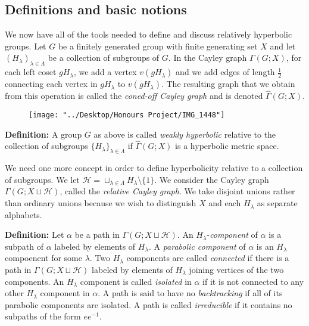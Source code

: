 \documentclass[12pt]{article}
\newcommand{\vs}{\vskip10pt}
\begin{document}
	\subsection{Definitions and basic notions}
	
	We now have all of the tools needed to define and discuss relatively hyperbolic groups. Let $G$ be a finitely generated group with finite generating set $X$ and let $(H_{\lambda})_{\lambda \in \Lambda}$ be a collection of subgroups of $G$. In the Cayley graph $\Gamma(G;X)$, for each left coset $gH_{\lambda}$, we add a vertex $v(gH_{\lambda})$ and we add edges of length $\frac{1}{2}$ connecting each vertex in $gH_{\lambda}$ to $v(gH_{\lambda})$. The resulting graph that we obtain from this operation is called the \textit{coned-off Cayley graph} and is denoted $\hat{\Gamma}(G;X)$.
	
	
	\vs 
\begin{figure}
	\centering
	\texttt{[image: "../Desktop/Honours Project/IMG\_1448"]}
	\caption{}
	\label{fig:img1448}
\end{figure}
	
	\textbf{Definition: } A group $G$ as above is called \textit{weakly hyperbolic} relative to the collection of subgroups $\{H_{\lambda}\}_{\lambda \in \Lambda}$ if $\hat{\Gamma}(G;X)$ is a hyperbolic metric space. 
	
	\vs 
	
	We need one more concept in order to define hyperbolicity relative to a collection of subgroups. We let $\mathcal{H} = \sqcup_{\lambda \in \Lambda} H_{\lambda} \setminus \{1\}$. We consider the Cayley graph $\Gamma(G; X \sqcup \mathcal{H})$, called the \textit{relative Cayley graph}. We take disjoint unions rather than ordinary unions because we wish to distinguish $X$ and each $H_{\lambda}$ as separate alphabets. 
	
	\vs 
	
	\textbf{Definition: } Let $\alpha$ be a path in $\Gamma(G; X \sqcup \mathcal{H})$. An $H_{\lambda}$-\textit{component} of $\alpha$ is a subpath of $\alpha$ labeled by elements of $H_{\lambda}$. A \textit{parabolic component} of $\alpha$ is an $H_{\lambda}$ compoenent for some $\lambda$. Two $H_{\lambda}$ components are called \textit{connected} if there is a path in $\Gamma(G; X \sqcup \mathcal{H})$ labeled by elements of $H_{\lambda}$ joining vertices of the two components. An $H_{\lambda}$ component is called \textit{isolated} in $\alpha$ if it is not connected to any other $H_{\lambda}$ component in $\alpha$. A path is said to have no \textit{backtracking} if all of its parabolic components are isolated. A path is called \textit{irreducible} if it contains no subpaths of the form $ee^{-1}$.
	
\end{document}
